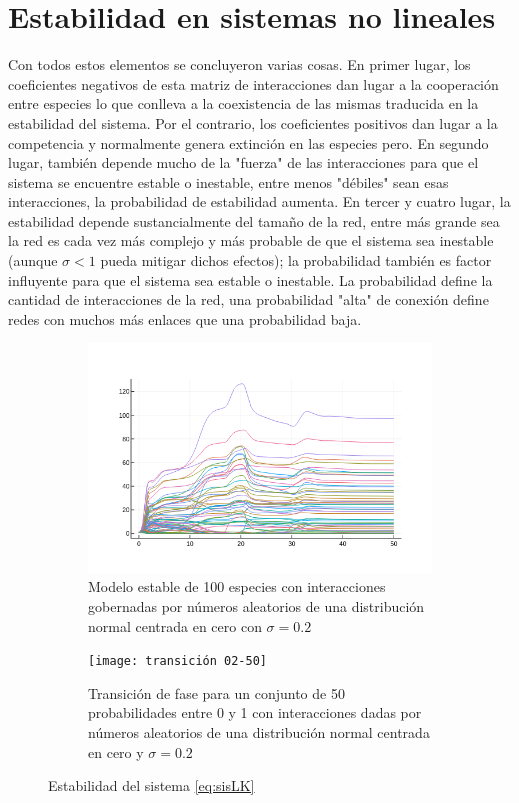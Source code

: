 \documentclass[11pt,a4paper]{article}
\begin{document}
\section{Estabilidad en sistemas no lineales}

Con todos estos elementos se concluyeron varias cosas. En primer lugar, los coeficientes negativos de esta matriz de interacciones dan lugar a la cooperación entre especies lo que conlleva a la coexistencia de las mismas traducida en la estabilidad del sistema. Por el contrario, los coeficientes positivos dan lugar a la competencia y normalmente genera extinción en las especies pero. En segundo lugar, también depende mucho de la "fuerza" de las interacciones para que el sistema se encuentre estable o inestable, entre menos "débiles" sean esas interacciones, la probabilidad de estabilidad aumenta. En tercer y cuatro lugar, la estabilidad depende sustancialmente del tamaño de la red, entre más grande sea la red es cada vez más complejo y más probable de que el sistema sea inestable (aunque $\sigma<1$ pueda mitigar dichos efectos); la probabilidad también es factor influyente para que el sistema sea estable o inestable. La probabilidad define la cantidad de interacciones de la red, una probabilidad "alta" de conexión define redes con muchos más enlaces que una probabilidad baja.
\begin{figure}[h!]
        \centering
        \begin{subfigure}[h]{0.5\textwidth} 
            \includegraphics[width=\textwidth]{Sistema estable 100}
            \caption{Modelo estable de 100 especies con interacciones gobernadas por números aleatorios de una distribución normal centrada en cero con $\sigma=0.2$}
            \label{fig:Sistema}
        \end{subfigure} 
        \hfill 
        \begin{subfigure}[h]{0.49\textwidth} 
            \texttt{[image: transición 02-50]}
            \caption{Transición de fase para un conjunto de 50 probabilidades entre 0 y 1 con interacciones dadas por números aleatorios de una distribución normal centrada en cero y $\sigma=0.2$}
            \label{fig:transicion}
        \end{subfigure}
        \caption{Estabilidad del sistema \ref{eq:sisLK}}
\end{figure}
\end{document}
